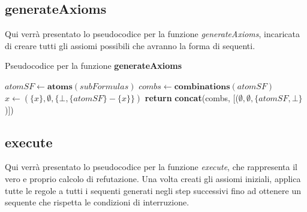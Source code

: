 \documentclass[\main/tesi.tex]{subfiles}
\begin{document}
\subsection{generateAxioms}
Qui verrà presentato lo pseudocodice per la funzione \textit{generateAxioms}, incaricata di creare tutti gli assiomi possibili che avranno la forma di sequenti. \\

\begin{algorithm}
    \caption{Pseudocodice per la funzione \textbf{generateAxioms}}\label{alg:generateAxioms}
    \begin{algorithmic}
        \State $atomSF \gets \textbf{atoms}(subFormulas)$
        \State $combs \gets \textbf{combinations}(atomSF)$
        \State $x \gets (\{x\}, \emptyset, \{\bot, \{atomSF\} - \{x\}\})$
        \EndFor
        \State \textbf{return} \textbf{concat}(combs, [($\emptyset, \emptyset, \{atomSF, \bot\}$)])
        \EndFunction
    \end{algorithmic}
\end{algorithm}

\subsection{execute}
Qui verrà presentato lo pseudocodice per la funzione \textit{execute}, che rappresenta il vero e proprio calcolo di refutazione. Una volta creati gli assiomi iniziali, applica tutte le regole a tutti i sequenti generati negli step successivi fino ad ottenere un sequente che rispetta le condizioni di interruzione. \\
\end{document}
